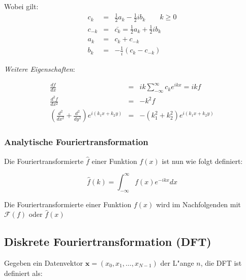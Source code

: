 \documentclass[german, 10pt, a4paper, twocolumn]{scrartcl}
\begin{document}
Wobei gilt:
\begin{eqnarray}
	c_k &	 	= & 	\frac{1}{2}a_k - \frac{1}{2}ib_k \qquad k\geq 0 \nonumber\\
	c_{-k} &	= &	\bar{c_k} = \frac{1}{2}a_k + \frac{1}{2}ib_k \nonumber \\
	a_k &		= &	c_k + c_{-k} \nonumber \\
	b_k &		= &	-\frac{1}{i}(c_k - c_{-k}) \nonumber
\end{eqnarray}

\textit{Weitere Eigenschaften}:

\begin{eqnarray*}
	\frac{d f}{d x} &	= &		ik\sum^\infty_{-\infty}c_k e^{ikx}= ikf \\
	\frac{d^2 f}{d x^2} &	= &		-k^2f  \\
	\left( \frac{d^2 }{d x^2}+\frac{d^2 }{d y^2}\right ) e^{i(k_1x +k_2y)} &	= &	-(k_1^2+k_2^2)e^{i(k_1x+k_2y)}
\end{eqnarray*}

\subsubsection{Analytische Fouriertransformation}

Die Fouriertransformierte $\hat{f}$ einer Funktion $f(x)$ ist nun wie folgt definiert:

\begin{displaymath}
	\hat{f}(k) = \int^\infty_{-\infty} f(x)e^{-ikx}dx
\end{displaymath}

Die Fouriertransformierte einer Funktion $f(x)$ wird im Nachfolgenden mit $\mathcal{F}(f)$ oder $\hat{f}(x)$

\subsection{Diskrete Fouriertransformation (DFT)}

Gegeben ein Datenvektor $\mathbf{x}=(x_0,x_1,\ldots,x_{N-1})$ der L"ange $n$, die DFT ist definiert als:\\
\end{document}
